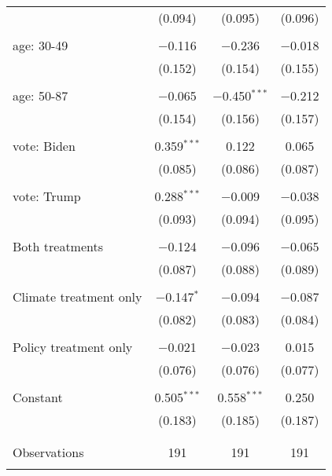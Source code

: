 \begin{tabular}{@{\extracolsep{5pt}}lccc}
  & (0.094) & (0.095) & (0.096) \\ 
  & & & \\ 
 age: 30-49 & $-$0.116 & $-$0.236 & $-$0.018 \\ 
  & (0.152) & (0.154) & (0.155) \\ 
  & & & \\ 
 age: 50-87 & $-$0.065 & $-$0.450$^{***}$ & $-$0.212 \\ 
  & (0.154) & (0.156) & (0.157) \\ 
  & & & \\ 
 vote: Biden & 0.359$^{***}$ & 0.122 & 0.065 \\ 
  & (0.085) & (0.086) & (0.087) \\ 
  & & & \\ 
 vote: Trump & 0.288$^{***}$ & $-$0.009 & $-$0.038 \\ 
  & (0.093) & (0.094) & (0.095) \\ 
  & & & \\ 
 Both treatments & $-$0.124 & $-$0.096 & $-$0.065 \\ 
  & (0.087) & (0.088) & (0.089) \\ 
  & & & \\ 
 Climate treatment only & $-$0.147$^{*}$ & $-$0.094 & $-$0.087 \\ 
  & (0.082) & (0.083) & (0.084) \\ 
  & & & \\ 
 Policy treatment only & $-$0.021 & $-$0.023 & 0.015 \\ 
  & (0.076) & (0.076) & (0.077) \\ 
  & & & \\ 
 Constant & 0.505$^{***}$ & 0.558$^{***}$ & 0.250 \\ 
  & (0.183) & (0.185) & (0.187) \\ 
  & & & \\ 
\hline \\[-1.8ex] 

Observations & 191 & 191 & 191 \\ 
\hline 
\hline \\[-1.8ex] 
\end{tabular} 